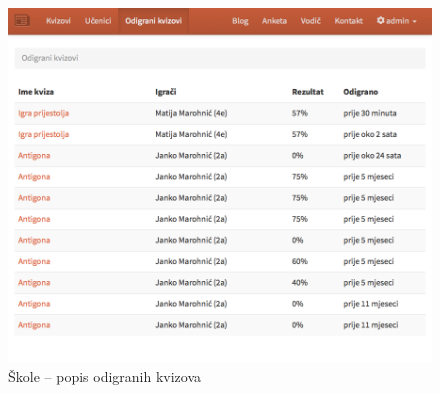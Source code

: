 \documentclass{scrreprt}
\begin{document}
\begin{figure}[H]
  \includegraphics[width=\textwidth, clip=true, trim=0 10cm 0 0, fbox]{school/played_quizzes}
  \caption{Škole -- popis odigranih kvizova}
  \label{played_quizzes}
\end{figure}
\end{document}

